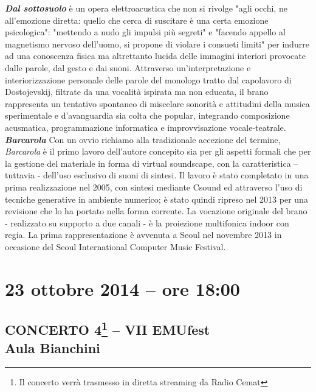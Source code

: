 \documentclass[9pt, twoside, a5paper]{extreport}
\newcommand{\descrizione}[2]{%
\noindent \textbf{\textit{#1}} %
#2 %
\\
}%
\begin{document}
\begin{multicols}{2}
\descrizione{Dal sottosuolo}{è un opera elettroacustica che non si rivolge "agli occhi, ne all’emozione diretta: quello che cerca di suscitare è una certa emozione psicologica": "mettendo a nudo gli impulsi più segreti" e "facendo appello al magnetismo nervoso dell’uomo, si propone di violare i consueti limiti" per indurre ad una conoscenza fisica ma altrettanto lucida delle immagini interiori provocate dalle parole, dal gesto e dai suoni. Attraverso un'interpretazione e interiorizzazione personale delle parole del monologo tratto dal capolavoro di Dostojevskij, filtrate da una vocalità ispirata ma non educata, il brano rappresenta un tentativo spontaneo di miscelare sonorità e attitudini della musica sperimentale e d'avanguardia sia colta che popular, integrando composizione acusmatica, programmazione informatica e improvvisazione vocale-teatrale.}

\descrizione{Barcarola}{Con un ovvio richiamo alla tradizionale accezione del termine, \textit{Barcarola} è il primo lavoro dell’autore concepito sia per gli aspetti formali che per la gestione del materiale in forma di virtual soundscape, con la caratteristica – tuttavia - dell’uso esclusivo di suoni di sintesi. Il lavoro è stato completato in una prima realizzazione nel 2005, con sintesi mediante Csound ed attraverso l’uso di tecniche generative in ambiente numerico; è stato quindi ripreso nel 2013 per una revisione che lo ha portato nella forma corrente. La vocazione originale del brano - realizzato su supporto a due canali - è la proiezione multifonica indoor con regia. La prima rappresentazione è avvenuta a Seoul nel novembre 2013 in occasione del Seoul International Computer Music Festival.}


\end{multicols}

\clearpage



\section*{23 ottobre 2014 -- ore 18:00}
\subsection*{{\small CONCERTO 4\footnote{{\normalsize Il concerto verrà trasmesso in diretta streaming da Radio Cemat}} -- VII EMUfest\\}\textsf{Aula Bianchini\\}}
\end{document}

